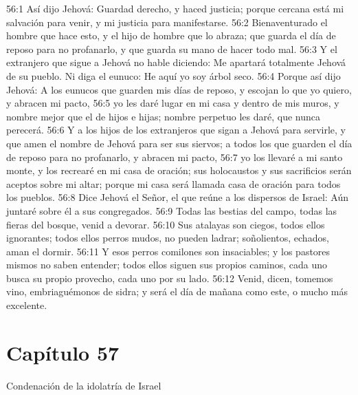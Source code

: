 56:1 Así dijo Jehová: Guardad derecho, y haced justicia; porque cercana está mi salvación para venir, y mi justicia para manifestarse. 
56:2 Bienaventurado el hombre que hace esto, y el hijo de hombre que lo abraza; que guarda el día de reposo para no profanarlo, y que guarda su mano de hacer todo mal. 
56:3 Y el extranjero que sigue a Jehová no hable diciendo: Me apartará totalmente Jehová de su pueblo. Ni diga el eunuco: He aquí yo soy árbol seco. 
56:4 Porque así dijo Jehová: A los eunucos que guarden mis días de reposo, y escojan lo que yo quiero, y abracen mi pacto, 
56:5 yo les daré lugar en mi casa y dentro de mis muros, y nombre mejor que el de hijos e hijas; nombre perpetuo les daré, que nunca perecerá. 
56:6 Y a los hijos de los extranjeros que sigan a Jehová para servirle, y que amen el nombre de Jehová para ser sus siervos; a todos los que guarden el día de reposo para no profanarlo, y abracen mi pacto, 
56:7 yo los llevaré a mi santo monte, y los recrearé en mi casa de oración; sus holocaustos y sus sacrificios serán aceptos sobre mi altar; porque mi casa será llamada casa de oración para todos los pueblos. 
56:8 Dice Jehová el Señor, el que reúne a los dispersos de Israel: Aún juntaré sobre él a sus congregados. 
56:9 Todas las bestias del campo, todas las fieras del bosque, venid a devorar. 
56:10 Sus atalayas son ciegos, todos ellos ignorantes; todos ellos perros mudos, no pueden ladrar; soñolientos, echados, aman el dormir. 
56:11 Y esos perros comilones son insaciables; y los pastores mismos no saben entender; todos ellos siguen sus propios caminos, cada uno busca su propio provecho, cada uno por su lado. 
56:12 Venid, dicen, tomemos vino, embriaguémonos de sidra; y será el día de mañana como este, o mucho más excelente. 
\section*{Capítulo 57 }
Condenación de la idolatría de Israel 
 

